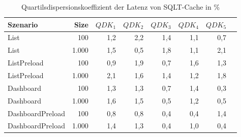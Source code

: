 
\begin{table}[ht]
\setlength{\extrarowheight}{-1pt}
\centering
\caption{Quartilsdispersionskoeffizient der Latenz von SQLT-Cache in \%}
\begin{tabular}{lrrrrrrr}
\toprule
Szenario & Size & ${QDK_1}$ & ${QDK_2}$ & ${QDK_3}$& ${QDK_4}$ & ${QDK_5}$ \\
\midrule
	List & 100 & \cellcolor{red!2}  1,2 & \cellcolor{red!3}  2,2 & \cellcolor{red!2}  1,4 & \cellcolor{red!2}  1,1 & \cellcolor{red!1}  0,7 \\
	List & 1.000 & \cellcolor{red!2}  1,5 & \cellcolor{red!1}  0,5 & \cellcolor{red!2}  1,8 & \cellcolor{red!2}  1,1 & \cellcolor{red!3}  2,1 \\
	ListPreload & 100 & \cellcolor{red!1}  0,9 & \cellcolor{red!2}  1,9 & \cellcolor{red!1}  0,7 & \cellcolor{red!2}  1,6 & \cellcolor{red!2}  1,3 \\
	ListPreload & 1.000 & \cellcolor{red!3}  2,1 & \cellcolor{red!2}  1,6 & \cellcolor{red!2}  1,4 & \cellcolor{red!2}  1,2 & \cellcolor{red!2}  1,8 \\
	Dashboard & 100 & \cellcolor{red!2}  1,3 & \cellcolor{red!2}  1,3 & \cellcolor{red!1}  0,7 & \cellcolor{red!2}  1,4 & \cellcolor{red!1}  0,3 \\
	Dashboard & 1.000 & \cellcolor{red!2}  1,6 & \cellcolor{red!2}  1,5 & \cellcolor{red!1}  0,5 & \cellcolor{red!2}  1,2 & \cellcolor{red!1}  0,5 \\
	DashboardPreload & 100 & \cellcolor{red!1}  0,8 & \cellcolor{red!1}  0,8 & \cellcolor{red!1}  0,4 & \cellcolor{red!1}  0,4 & \cellcolor{red!2}  1,4 \\
	DashboardPreload & 1.000 & \cellcolor{red!2}  1,4 & \cellcolor{red!2}  1,3 & \cellcolor{red!1}  0,4 & \cellcolor{red!1}  1,0 & \cellcolor{red!1}  0,4 \\
\bottomrule
\end{tabular}
\label{tab:quartilsdispersionskoeffizient_latenz_sqltcache}
\end{table}
	